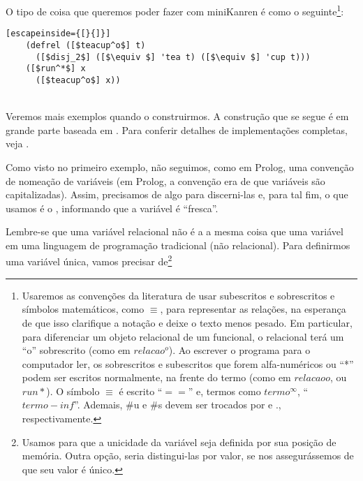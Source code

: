   O tipo de coisa que queremos poder fazer com miniKanren é como o
  seguinte\footnote{Usaremos as convenções da literatura de usar
    subescritos e sobrescritos e símbolos matemáticos, como $\equiv $, para
    representar as relações, na esperança de que isso clarifique a
    notação e deixe o texto menos pesado. Em particular, para
    diferenciar um objeto relacional de um funcional, o relacional
    terá um ``o'' sobrescrito (como em $relacao^o$). Ao escrever o
    programa para o computador ler, os sobrescritos e subescritos que
    forem alfa-numéricos ou ``*'' podem ser escritos normalmente, na
    frente do termo (como em $relacaoo$, ou $run*$). O símbolo $\equiv$ é
    escrito ``$==$'' e, termos como $termo^\infty$,
    ``$termo-inf$''. Ademais, \#u e \#s devem ser trocados por
     e ., respectivamente.}:
  \\

  \begin{lstlisting}[escapeinside={[}{]}]
    (defrel ([$teacup^o$] t)
      ([$disj_2$] ([$\equiv $] 'tea t) ([$\equiv $] 'cup t)))
    ([$run^*$] x
      ([$teacup^o$] x))
  \end{lstlisting}
  \hspace{1cm} \seta\ \\



  Veremos mais exemplos quando o construirmos. A construção que se segue
  é em grande parte baseada em \cite{will}. Para conferir detalhes de
  implementações completas, veja \cite{kanren}.

  Como visto no primeiro exemplo, não seguimos, como em Prolog, uma
  convenção de nomeação de variáveis (em Prolog, a convenção era de
  que variáveis são  capitalizadas). Assim, precisamos de algo para
  discerni-las e, para tal fim, o que usamos é o ,
  informando que a variável é ``fresca''.
  
  Lembre-se que uma variável relacional não é a a mesma
  coisa que uma variável em uma linguagem de programação tradicional
  (não relacional). Para definirmos uma variável única, vamos precisar
  de\footnote{Usamos  para que a unicidade da
    variável seja definida por sua posição de memória. Outra opção,
    seria distingui-las por valor, se nos assegurássemos de que seu valor
    é único.}
  
